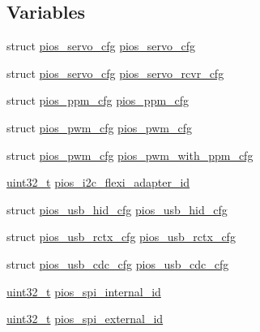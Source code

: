 \subsection*{Variables}
\begin{DoxyCompactItemize}
\item 
struct \hyperlink{structpios__servo__cfg}{pios\-\_\-servo\-\_\-cfg} \hyperlink{group___tau_labs_core_ga57a87ef16d7949a9cc3589efc8d88a28}{pios\-\_\-servo\-\_\-cfg}
\item 
struct \hyperlink{structpios__servo__cfg}{pios\-\_\-servo\-\_\-cfg} \hyperlink{group___tau_labs_core_gaa111328ef9a12c806ed1c24b93d4f663}{pios\-\_\-servo\-\_\-rcvr\-\_\-cfg}
\item 
struct \hyperlink{structpios__ppm__cfg}{pios\-\_\-ppm\-\_\-cfg} \hyperlink{group___tau_labs_core_ga256c8c512691a72ee2ed15d1a9041810}{pios\-\_\-ppm\-\_\-cfg}
\item 
struct \hyperlink{structpios__pwm__cfg}{pios\-\_\-pwm\-\_\-cfg} \hyperlink{group___tau_labs_core_ga7587f8e174df90bef8cec1edfa9e14c1}{pios\-\_\-pwm\-\_\-cfg}
\item 
struct \hyperlink{structpios__pwm__cfg}{pios\-\_\-pwm\-\_\-cfg} \hyperlink{group___tau_labs_core_ga6a7a8338c617f18384f3b3c5678f5505}{pios\-\_\-pwm\-\_\-with\-\_\-ppm\-\_\-cfg}
\item 
\hyperlink{stdint_8h_a435d1572bf3f880d55459d9805097f62}{uint32\-\_\-t} \hyperlink{group___tau_labs_core_ga00c59288b3ddcecb262b920ef5ae6ce1}{pios\-\_\-i2c\-\_\-flexi\-\_\-adapter\-\_\-id}
\item 
struct \hyperlink{structpios__usb__hid__cfg}{pios\-\_\-usb\-\_\-hid\-\_\-cfg} \hyperlink{group___tau_labs_core_ga3665f6d3a2cccc431b55b9432291e94c}{pios\-\_\-usb\-\_\-hid\-\_\-cfg}
\item 
struct \hyperlink{structpios__usb__rctx__cfg}{pios\-\_\-usb\-\_\-rctx\-\_\-cfg} \hyperlink{group___tau_labs_core_gaf4a39af8b0cf8dcab89860e8309804eb}{pios\-\_\-usb\-\_\-rctx\-\_\-cfg}
\item 
struct \hyperlink{structpios__usb__cdc__cfg}{pios\-\_\-usb\-\_\-cdc\-\_\-cfg} \hyperlink{group___tau_labs_core_ga05cc3e449d417c7f9097d2659e6f5ca3}{pios\-\_\-usb\-\_\-cdc\-\_\-cfg}
\item 
\hyperlink{stdint_8h_a435d1572bf3f880d55459d9805097f62}{uint32\-\_\-t} \hyperlink{group___tau_labs_core_ga1ddbcf6dfeda2fbe6bbf0b14f011032f}{pios\-\_\-spi\-\_\-internal\-\_\-id}
\item 
\hyperlink{stdint_8h_a435d1572bf3f880d55459d9805097f62}{uint32\-\_\-t} \hyperlink{group___tau_labs_core_gabe70a8116c4e52c82ce8151bf5d64dec}{pios\-\_\-spi\-\_\-external\-\_\-id}

\end{DoxyCompactItemize}
